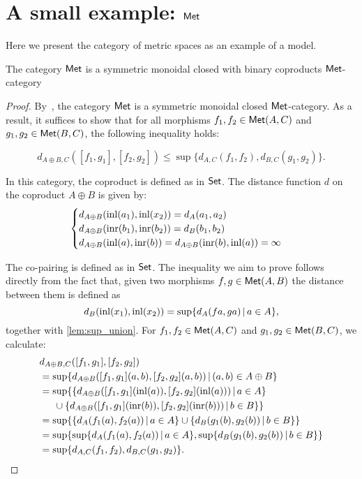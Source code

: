 \section{A small example: $\mathsf{Met}$}

Here we present the category of metric spaces as an example of a model.

\begin{proposition}
        \label{prop:vcat}
        The category $\mathsf{Met}$ is a symmetric monoidal closed with binary coproducts $\mathsf{Met}$-category 
\end{proposition}

\begin{proof}
  By~\cite[Example 3.8]{dahlqvist2023syntactic}, the category $\mathsf{Met}$ is a symmetric monoidal closed $\mathsf{Met}$-category. As a result, it suffices to show that for all morphisms \( f_1, f_2 \in \mathsf{Met}(A, C) \) and \( g_1, g_2 \in \mathsf{Met}(B, C) \), the following inequality holds:
  
\[
  d_{A \oplus B, C}([f_1, g_1], [f_2, g_2]) \leq \sup \{d_{A,C}(f_1, f_2), d_{B,C}(g_1, g_2)\}.
\]

In this category, the coproduct is defined as in $\mathsf{Set}$. The distance function $d$ on the coproduct $A \oplus B$ is given by:
   \[
    \begin{cases}
    d_{A \oplus B}(\mathrm{inl}(a_1),\mathrm{inl}(x_2)) = d_A(a_1,a_2) \\
    d_{A \oplus B}(\mathrm{inr}(b_1),\mathrm{inr}(b_2)) = d_B(b_1,b_2) \\
    d_{A \oplus B}(\mathrm{inl}(a), \mathrm{inr}(b)) = 
    d_{A \oplus B}(\mathrm{inr}(b), \mathrm{inl}(a))  = \infty
    \end{cases}
    \]

    The co-pairing is defined as in $\mathsf{Set}$. The inequality we aim to prove follows directly from the fact that, given two morphisms  $f,g\in \mathsf{Met}(A, B)$ the distance between them is defined as 
  $$ d_{B}(\mathrm{inl}(x_1),\mathrm{inl}(x_2)) = \sup \{ d_A (f a, g a) \,\vert \, a \in A \} ,$$  
    together with \autoref{lem:sup_union}. For  \( f_1, f_2 \in \mathsf{Met}(A, C) \) and \( g_1, g_2 \in \mathsf{Met}(B, C) \), we calculate:
    \begin{align*}
      & d_{A \oplus B, C}([f_1, g_1], [f_2, g_2]) \\
      &  =  \sup \{ d_{A\oplus B} ([f_1, g_1] (a,b), [f_2, g_2] (a,b)) \,\vert \, (a,b) \in A \oplus B \} \\
      & =  \sup \{ \{ d_{A\oplus B} ([f_1, g_1] (\mathrm{inl}(a)), [f_2, g_2] (\mathrm{inl}(a))) \,\vert \, a \in A \}    \\
      & \hspace{15pt} \cup \{d_{A\oplus B} ([f_1, g_1] (\mathrm{inr}(b)), [f_2, g_2] (\mathrm{inr}(b))) \,\vert \, b \in B\}\} \\
      & = \sup \{ \{ d_{A}(f_1 (a), f_2 (a)) \,\vert \, a \in A \} \cup  \{d_{B}(g_1 (b), g_2 (b)) \,\vert \, b \in B \}\} \\
      & = \sup   \{ \sup \{ d_{A}(f_1 (a), f_2 (a)) \,\vert \, a \in A \}, \sup\{d_{B}(g_1 (b), g_2 (b)) \,\vert \, b \in B \}\} \\
      &=  \sup \{d_{A,C}(f_1, f_2), d_{B,C}(g_1, g_2)\}. 
    \end{align*}
\end{proof}
